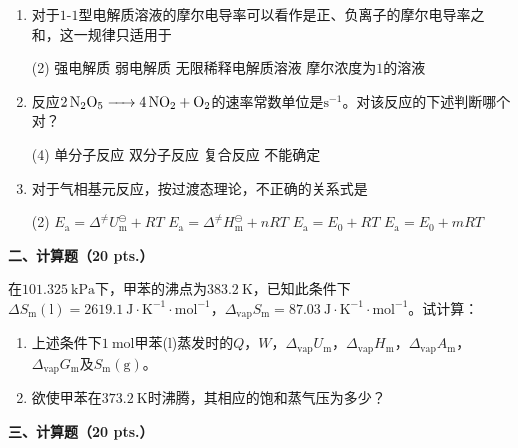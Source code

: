 \begin{enumerate}[label=\arabic*., itemsep=1.5ex]
\begin{tasks}
        \task $0$级反应
        \task $1.5$级反应
        \task $2$级反应
        \task $1$级反应
    \end{tasks}
    \item 对于$1$-$1$型电解质溶液的摩尔电导率可以看作是正、负离子的摩尔电导率之和，这一规律只适用于
    \begin{tasks}(2)
        \task 强电解质
        \task 弱电解质
        \task 无限稀释电解质溶液
        \task 摩尔浓度为$1$的溶液
    \end{tasks}
    \item 反应$\ce{2N2O5 -> 4NO2 + O2}$的速率常数单位是$\mathrm{s^{-1}}$。对该反应的下述判断哪个对？
    \begin{tasks}(4)
        \task 单分子反应
        \task 双分子反应
        \task 复合反应
        \task 不能确定
    \end{tasks}
    \item 对于气相基元反应，按过渡态理论，不正确的关系式是
    \begin{tasks}(2)
        \task $E_\mathrm{a} = \Delta^\neq U_\mathrm{m}^\ominus + RT$
        \task $E_\mathrm{a} = \Delta^\neq H_\mathrm{m}^\ominus + nRT$
        \task $E_\mathrm{a} = E_0 + RT$
        \task $E_\mathrm{a} = E_0 + mRT$
    \end{tasks}
\end{enumerate}

\vspace{0.5cm}
\noindent\textbf{二、计算题（20 pts.）}

在$101.325\ \mathrm{kPa}$下，甲苯的沸点为$383.2\ \mathrm{K}$，已知此条件下$\Delta S_\mathrm{m}(\mathrm{l})=2619.1\ \mathrm{J\cdot K^{-1}\cdot mol^{-1}}$，$\Delta_\mathrm{vap}S_\mathrm{m}=87.03\ \mathrm{J\cdot K^{-1}\cdot mol^{-1}}$。试计算：
\begin{enumerate}[label=(\arabic*), itemsep=1ex]
    \item 上述条件下$1\ \mathrm{mol}$甲苯(l)蒸发时的$Q$，$W$，$\Delta_\mathrm{vap}U_\mathrm{m}$，$\Delta_\mathrm{vap}H_\mathrm{m}$，$\Delta_\mathrm{vap}A_\mathrm{m}$，$\Delta_\mathrm{vap}G_\mathrm{m}$及$S_\mathrm{m}(\mathrm{g})$。
    \item 欲使甲苯在$373.2\ \mathrm{K}$时沸腾，其相应的饱和蒸气压为多少？
\end{enumerate}

\vspace{0.5cm}
\noindent\textbf{三、计算题（20 pts.）}

